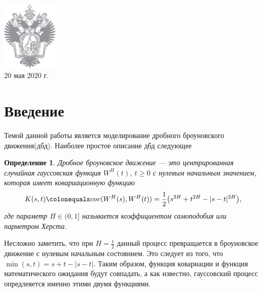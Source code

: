 \documentclass[a4paper,12pt]{article}
\numberwithin{equation}{section}
\newcommand{\defeq}{\colonequals}
\newcommand{\W}{W^H}
\newtheorem{Definition}{Определение}
\begin{document}
\begin{titlepage}
		
		
		
		\includegraphics[width=100px]{Spbu-logo.png}\\[2cm] %
		
		
		
		{\large 20 мая 2020 г.} %
		
		
		\vfill
		
		
	\end{titlepage}
	\newpage
	
	\section{Введение}
	Темой данной работы является моделирование дробного броуновского движения(дбд). Наиболее простое описание дбд следующее
	\begin{Definition}
		Дробное броуновское движение --- это центрированная случайная гауссовская функция $\W(t)$, $t\geq 0$ с нулевым начальным значением, которая имеет ковариационную функцию 
		\begin{align}
		\begin{split}\label{cov}
		K(s,t)\defeq cov(\W(s), \W(t)) = \frac{1}{2}\bigr(s^{2H}+t^{2H}-|s-t|^{2H}\bigr),
		\end{split}
		\end{align}
		где параметр $H \in (0,1]$ называется коэффициентом самоподобия или парметром Херста. 
	\end{Definition}
	Несложно заметить, что при $H = \frac{1}{2}$ данный процесс превращается в броуновское движение с нулевым начальным состоянием. Это следует из того, что $\min(s,t) = s+t - |s-t|$. Таким образом, функция ковариации и функция математического ожидания будут совпадать, а как известно, гауссовский процесс опредлеяется именно этими двумя функциями. 
	
\end{document}
